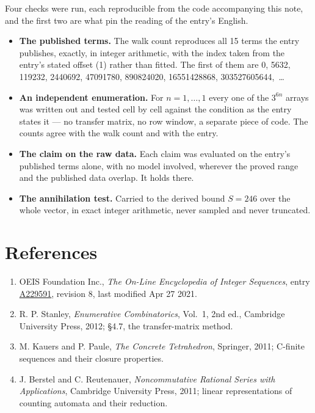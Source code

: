 \documentclass[11pt]{article}
\theoremstyle{definition}
\begin{document}
Four checks were run, each reproducible from the code accompanying this note, and the first two are what pin the reading of the entry's English.

\begin{itemize}

\item {\bfseries The published terms.} The walk count reproduces all 15 terms the entry publishes, exactly, in integer arithmetic, with the index taken from the entry's stated offset (1) rather than fitted. The first of them are 0, 5632, 119232, 2440692, 47091780, 890824020, 16551428868, 303527605644,~\dots

\item {\bfseries An independent enumeration.} For $n = 1,\dots,1$ every one of the $3^{6n}$ arrays was written out and tested cell by cell against the condition as the entry states it --- no transfer matrix, no row window, a separate piece of code. The counts agree with the walk count and with the entry.

\item {\bfseries The claim on the raw data.} Each claim was evaluated on the entry's published terms alone, with no model involved, wherever the proved range and the published data overlap. It holds there.

\item {\bfseries The annihilation test.} Carried to the derived bound $S = 246$ over the whole vector, in exact integer arithmetic, never sampled and never truncated.

\end{itemize}

\section{References}

\begin{enumerate}

\item OEIS Foundation Inc., \emph{The On-Line Encyclopedia of Integer Sequences}, entry \href{https://oeis.org/A229591}{A229591}, revision 8, last modified Apr 27 2021.

\item R. P. Stanley, \emph{Enumerative Combinatorics}, Vol.~1, 2nd ed., Cambridge University Press, 2012; \S4.7, the transfer-matrix method.

\item M. Kauers and P. Paule, \emph{The Concrete Tetrahedron}, Springer, 2011; C-finite sequences and their closure properties.

\item J. Berstel and C. Reutenauer, \emph{Noncommutative Rational Series with Applications}, Cambridge University Press, 2011; linear representations of counting automata and their reduction.

\end{enumerate}
\end{document}
